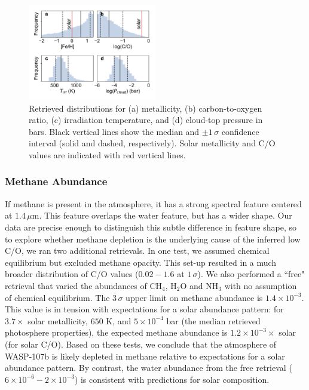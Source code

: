 \documentclass[twocolumn, trackchanges]{aastex61}
\begin{document}
\begin{figure}
\includegraphics[width = 0.5\textwidth]{fig4_retrieval.pdf}
\caption{Retrieved distributions for (a) metallicity, (b) carbon-to-oxygen ratio, (c) irradiation temperature, and (d) cloud-top pressure in bars. Black vertical lines show the median and $\pm1\,\sigma$ confidence interval (solid and dashed, respectively). Solar metallicity and C/O values are indicated with red vertical lines.}  \label{fig:retrieval}
\end{figure}

\subsubsection{Methane Abundance}
If methane is present in the atmosphere, it has a strong spectral feature centered at $1.4\,\mu$m. This feature overlaps the water feature, but has a wider shape. Our data are precise enough to distinguish this subtle difference in feature shape, so to explore whether methane depletion is the underlying cause of the inferred low C/O, we ran two additional retrievals.  In one test, we assumed chemical equilibrium but excluded methane opacity. This set-up resulted in a much broader distribution of C/O values ($0.02 - 1.6$ at $1\,\sigma$).  We also performed a ``free" retrieval that varied the abundances of CH$_4$, H$_2$O and NH$_3$ with no assumption of chemical equilibrium. The $3\,\sigma$ upper limit on methane abundance is $1.4\times10^{-3}$. This value is in tension with expectations for a solar abundance pattern: for $3.7\times$ solar metallicity, $650$ K, and $5\times10^{-4}$ bar (the median retrieved photosphere properties), the expected methane abundance is $1.2\times10^{-3}\times$ solar (for solar C/O). Based on these tests, we conclude that the atmosphere of WASP-107b is likely depleted in methane relative to expectations for a solar abundance pattern. By contrast, the water abundance from the free retrieval ($6\times10^{-6} - 2\times10^{-3}$) is consistent with predictions for solar composition. 
	
\end{document}
